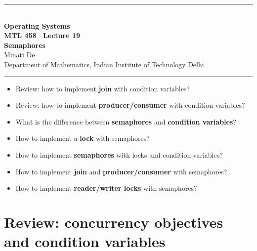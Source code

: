 \documentclass[11pt,a4paper]{article}
\begin{document}
\begin{center}
{\color{rulegray}\rule{\textwidth}{1.1pt}}\\[0.45em]
{\LARGE\bfseries Operating Systems}\\[0.25em]
{\Large\bfseries MTL 458 \textperiodcentered\ Lecture 19}\\[0.35em]
{\LARGE\bfseries Semaphores}\\[0.35em]
{\large Minati De}\\[0.15em]
{\normalsize Department of Mathematics, Indian Institute of Technology Delhi}\\[0.35em]
{\color{rulegray}\rule{\textwidth}{1.1pt}}
\end{center}

\vspace{0.4em}
\begin{keybox}
\begin{itemize}
  \item Review: how to implement \textbf{join} with condition variables?
  \item Review: how to implement \textbf{producer/consumer} with condition
        variables?
  \item What is the difference between \textbf{semaphores} and
        \textbf{condition variables}?
  \item How to implement a \textbf{lock} with semaphores?
  \item How to implement \textbf{semaphores} with locks and condition
        variables?
  \item How to implement \textbf{join} and \textbf{producer/consumer} with
        semaphores?
  \item How to implement \textbf{reader/writer locks} with semaphores?
\end{itemize}
\end{keybox}

\tableofcontents
\vspace{0.6em}
\noindent{\color{rulegray}\rule{\textwidth}{0.4pt}}

\section{Review: concurrency objectives and condition variables}
\end{document}
